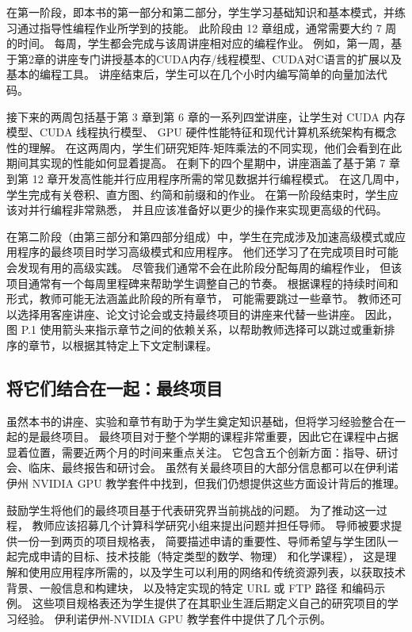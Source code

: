 在第一阶段，即本书的第一部分和第二部分，学生学习基础知识和基本模式，并练习通过指导性编程作业所学到的技能。 
此阶段由 12 章组成，通常需要大约 7 周的时间。 每周，学生都会完成与该周讲座相对应的编程作业。 
例如，第一周，基于第2章的讲座专门讲授基本的CUDA内存/线程模型、CUDA对C语言的扩展以及基本的编程工具。 
讲座结束后，学生可以在几个小时内编写简单的向量加法代码。

接下来的两周包括基于第 3 章到第 6 章的一系列四堂讲座，让学生对 CUDA 内存模型、CUDA 线程执行模型、
GPU 硬件性能特征和现代计算机系统架构有概念性的理解。 
在这两周内，学生们研究矩阵-矩阵乘法的不同实现，他们会看到在此期间其实现的性能如何显着提高。 
在剩下的四个星期中，讲座涵盖了基于第 7 章到第 12 章开发高性能并行应用程序所需的常见数据并行编程模式。
在这几周中，学生完成有关卷积、直方图、约简和前缀和的作业。 在第一阶段结束时，学生应该对并行编程非常熟悉，
并且应该准备好以更少的操作来实现更高级的代码。

在第二阶段（由第三部分和第四部分组成）中，学生在完成涉及加速高级模式或应用程序的最终项目时学习高级模式和应用程序。 
他们还学习了在完成项目时可能会发现有用的高级实践。 尽管我们通常不会在此阶段分配每周的编程作业，
但该项目通常有一个每周里程碑来帮助学生调整自己的节奏。 根据课程的持续时间和形式，教师可能无法涵盖此阶段的所有章节，
可能需要跳过一些章节。 教师还可以选择用客座讲座、论文讨论会或支持最终项目的讲座来代替一些讲座。 
因此，图 P.1 使用箭头来指示章节之间的依赖关系，以帮助教师选择可以跳过或重新排序的章节，以根据其特定上下文定制课程。

\subsection{将它们结合在一起：最终项目}
虽然本书的讲座、实验和章节有助于为学生奠定知识基础，但将学习经验整合在一起的是最终项目。 
最终项目对于整个学期的课程非常重要，因此它在课程中占据显着位置，需要近两个月的时间来重点关注。 
它包含五个创新方面：指导、研讨会、临床、最终报告和研讨会。 
虽然有关最终项目的大部分信息都可以在伊利诺伊州 NVIDIA GPU 教学套件中找到，但我们仍想提供这些方面设计背后的推理。

鼓励学生将他们的最终项目基于代表研究界当前挑战的问题。 为了推动这一过程，
教师应该招募几个计算科学研究小组来提出问题并担任导师。 导师被要求提供一份一到两页的项目规格表，
简要描述申请的重要性、导师希望与学生团队一起完成申请的目标、技术技能（特定类型的数学、物理） 和化学课程），
这是理解和使用应用程序所需的，以及学生可以利用的网络和传统资源列表，以获取技术背景、一般信息和构建块，
以及特定实现的特定 URL 或 FTP 路径 和编码示例。 
这些项目规格表还为学生提供了在其职业生涯后期定义自己的研究项目的学习经验。 
伊利诺伊州-NVIDIA GPU 教学套件中提供了几个示例。


